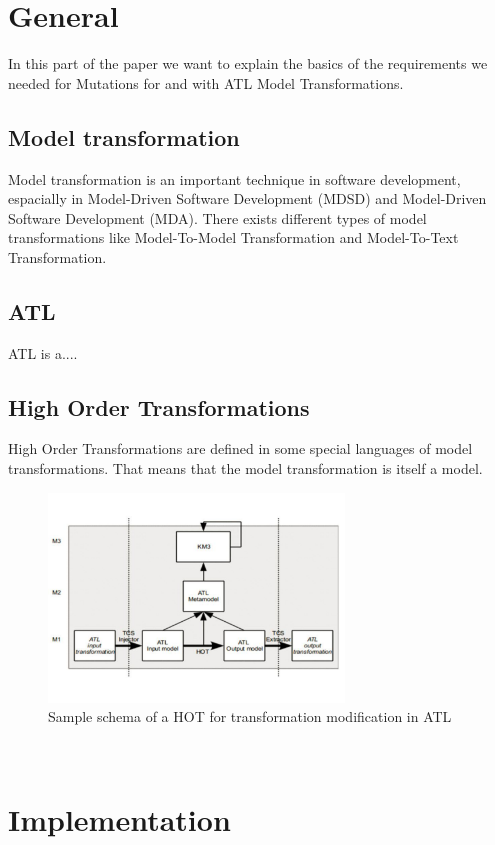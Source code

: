\documentclass{llncs}
\begin{document}
\section{General}
In this part of the paper we want to explain the basics of the requirements we needed for Mutations for and with ATL Model Transformations.

\subsection{Model transformation}
Model transformation is an important technique in software development, espacially in Model-Driven Software Development (MDSD) and Model-Driven Software Development (MDA). There exists different types of model transformations like Model-To-Model Transformation and Model-To-Text Transformation.  

\subsection{ATL}
ATL is a....

\subsection{High Order Transformations}
High Order Transformations are defined in some special languages of model
transformations. That means that the model transformation is itself a model. 

\begin{figure}[tb]
	\centering
	\includegraphics[width=0.7\textwidth]{figures/HOT}
	\caption{Sample schema of a HOT for transformation modification in ATL}
	\label{fig:samplefigure_pdf}
\end{figure}~\cite{misc:ModelingLanguages}

\section{Implementation}
\end{document}
